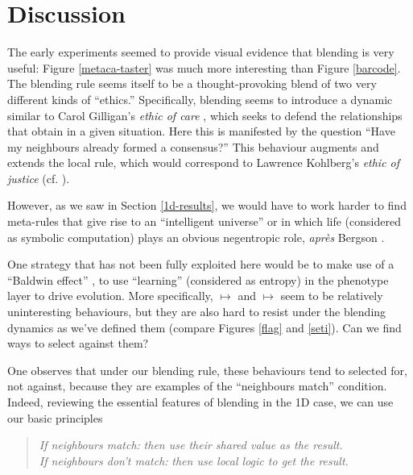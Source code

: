 \documentclass{AISB2008}
\makeatletter
\renewcommand{\boxed}[1]{\text{\fboxsep=.2em\fbox{\m@th$\displaystyle#1$}}}
\newcommand{\mystrut}{\vphantom{b\gamma}}
\makeatother
\begin{document}
\section{Discussion}

The early experiments seemed to provide visual evidence that blending
is very useful: Figure \ref{metaca-taster} was much more interesting
than Figure \ref{barcode}.  The blending rule seems itself to be a
thought-provoking blend of two very different kinds of ``ethics.''
Specifically, blending seems to introduce a dynamic similar to Carol
Gilligan's \emph{ethic of care} \cite{gilligan1982different}, which
seeks to defend the relationships that obtain in a given situation.
Here this is manifested by the question ``Have my neighbours already
formed a consensus?''  This behaviour augments and extends the local
rule, which would correspond to Lawrence Kohlberg’s \emph{ethic of
  justice} (cf. \cite{benhabib1985generalized}).

However, as we saw in Section \ref{1d-results}, we would have to work
harder to find meta-rules that give rise to an ``intelligent
universe'' or in which life (considered as symbolic computation) plays
an obvious negentropic role, \emph{apr\`es} Bergson
\cite{bergson1912creative}.

One strategy that has not been fully exploited here would be to make
use of a ``Baldwin effect'' \cite{baldwin-effect,weber2003evolution},
to use ``learning'' (considered as entropy) in the phenotype layer to
drive evolution.  More specifically,
\boxed{0\mystrut}\boxed{0\mystrut}\boxed{0\mystrut} $\mapsto$
\boxed{0\mystrut} and
\boxed{1\mystrut}\boxed{1\mystrut}\boxed{1\mystrut} $\mapsto$
\boxed{1\mystrut} seem to be relatively uninteresting behaviours, but
they are also hard to resist under the blending dynamics as we've
defined them (compare Figures \ref{flag} and \ref{seti}).  Can we find
ways to select against them?

One observes that under our blending rule, these behaviours tend to
selected for, not against, because they are examples of the
``neighbours match'' condition.  Indeed, reviewing the essential
features of blending in the 1D case, we can use our basic principles

\begin{quote}
 \emph{If neighbours match:} \emph{then use their shared value as the result.}\\
 \emph{If neighbours don't match:} \emph{then use local logic to get the result.}
\end{quote}
\end{document}
